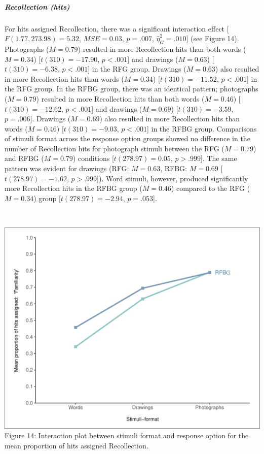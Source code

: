 \documentclass[
  11pt,
]{article}
\begin{document}
\hypertarget{recollection-hits}{%
\subparagraph{Recollection (hits)}\label{recollection-hits}}

For hits assigned Recollection, there was a significant interaction
effect {[}\(F(1.77, 273.98) = 5.32\), \(\mathit{MSE} = 0.03\),
\(p = .007\), \(\hat{\eta}^2_G = .010\){]} (see Figure 14). Photographs
(\(M = 0.79\)) resulted in more Recollection hits than both words
(\(M = 0.34\)) {[}\(t(310) = -17.90\), \(p < .001\){]} and drawings
(\(M = 0.63\)) {[}\(t(310) = -6.38\), \(p < .001\){]} in the RFG group.
Drawings (\(M = 0.63\)) also resulted in more Recollection hits than
words (\(M = 0.34\)) {[}\(t(310) = -11.52\), \(p < .001\){]} in the RFG
group. In the RFBG group, there was an identical pattern; photographs
(\(M = 0.79\)) resulted in more Recollection hits than both words
(\(M = 0.46\)) {[}\(t(310) = -12.62\), \(p < .001\){]} and drawings
(\(M = 0.69\)) {[}\(t(310) = -3.59\), \(p = .006\){]}. Drawings
(\(M = 0.69\)) also resulted in more Recollection hits than words
(\(M = 0.46\)) {[}\(t(310) = -9.03\), \(p < .001\){]} in the RFBG group.
Comparisons of stimuli format across the response option groups showed
no difference in the number of Recollection hits for photograph stimuli
between the RFG (\(M = 0.79\)) and RFBG (\(M = 0.79\)) conditions
{[}\(t(278.97) = 0.05\), \(p > .999\){]}. The same pattern was evident
for drawings (RFG: \(M = 0.63\), RFBG: \(M = 0.69\)
{[}\(t(278.97) = -1.62\), \(p > .999\){]}). Word stimuli, however,
produced significantly more Recollection hits in the RFBG group
(\(M = 0.46\)) compared to the RFG (\(M = 0.34\)) group
{[}\(t(278.97) = -2.94\), \(p = .053\){]}.

~

\includegraphics{R--Thesis_files/figure-latex/unnamed-chunk-39-1.pdf}
Figure 14: Interaction plot between stimuli format and response option
for the mean proportion of hits assigned Recollection.
\end{document}
